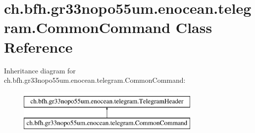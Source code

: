 \hypertarget{classch_1_1bfh_1_1gr33nopo55um_1_1enocean_1_1telegram_1_1_common_command}{}\section{ch.\+bfh.\+gr33nopo55um.\+enocean.\+telegram.\+Common\+Command Class Reference}
\label{classch_1_1bfh_1_1gr33nopo55um_1_1enocean_1_1telegram_1_1_common_command}
Inheritance diagram for ch.\+bfh.\+gr33nopo55um.\+enocean.\+telegram.\+Common\+Command\+:\begin{figure}[H]
\begin{center}
\leavevmode
\includegraphics[height=2.000000cm]{classch_1_1bfh_1_1gr33nopo55um_1_1enocean_1_1telegram_1_1_common_command}
\end{center}
\end{figure}
